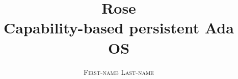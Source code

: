 \title{\Huge \textbf{Rose} \\ \huge Capability-based persistent Ada OS}
\author{\textsc{First-name Last-name}}
